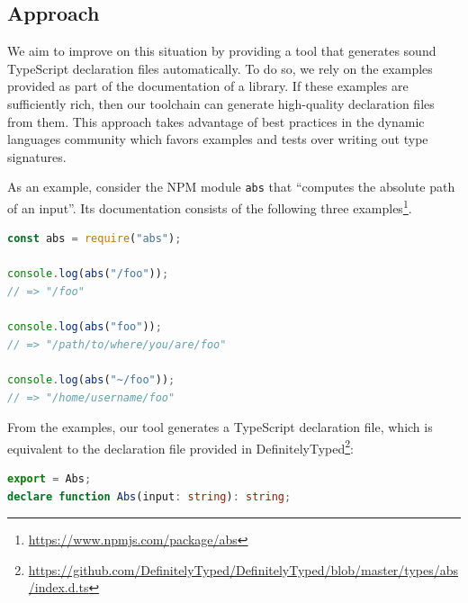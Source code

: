 \documentclass[english,cleveref,autoref,submission]{programming}
\begin{document}
\subsection{Approach}
\label{sec:approach}


We aim to improve on this situation by providing a tool that generates
sound TypeScript declaration files automatically. To do so, we rely on the examples provided
as part of the documentation of a library. If these
examples are sufficiently rich, then our toolchain can generate
high-quality declaration files from them. This approach takes
advantage of 
best practices in the dynamic languages community which favors
examples and tests over writing out type signatures.

As an example, consider the NPM module
\texttt{abs} that
``computes the absolute path of an input''. Its documentation consists
of the following three examples\footnote{\url{https://www.npmjs.com/package/abs}}.
\begin{lstlisting}[language=JavaScript,numbers=none]
const abs = require("abs");
 
console.log(abs("/foo"));
// => "/foo"
 
console.log(abs("foo"));
// => "/path/to/where/you/are/foo"
 
console.log(abs("~/foo"));
// => "/home/username/foo"
\end{lstlisting}
From the examples, our tool generates a TypeScript declaration file,
which is equivalent to the declaration file provided in
DefinitelyTyped\footnote{\url{https://github.com/DefinitelyTyped/DefinitelyTyped/blob/master/types/abs/index.d.ts}}: 
\begin{lstlisting}[language=TypeScript,numbers=none]
export = Abs;
declare function Abs(input: string): string;
\end{lstlisting}
\end{document}
